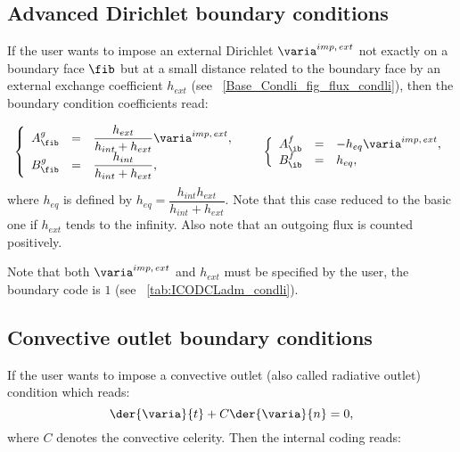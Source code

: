 \subsection{Advanced Dirichlet boundary conditions}
If the user wants to impose an external Dirichlet $\varia^{imp, \, ext}$ not exactly on a boundary face $\fib$ but at a small distance
related to the boundary face by an external exchange coefficient $h_{ext}$
(see \figurename~\ref{Base_Condli_fig_flux_condli}), then  the boundary condition coefficients read:

\begin{equation}
\begin{array}{r c l}
\left\lbrace
\begin{array}{r c l}
A^g_\fib & = &\dfrac{h_{ext}}{h_{int}+h_{ext}} \varia^{imp, \, ext}, \\
B^g_\fib & = & \dfrac{h_{int}}{h_{int}+h_{ext}} ,
\end{array}
\right.
& &
\left\lbrace
\begin{array}{r c l}
A^f_\ib & = & -h_{eq} \varia^{imp, \, ext} , \\
B^f_\ib & = & h_{eq},
\end{array}
\right.
\end{array}
\end{equation}
where $h_{eq} $ is defined by $h_{eq}=\dfrac{h_{int} h_{ext}}{ h_{int} + h_{ext}}$.
Note that this case reduced to the basic one if $h_{ext}$ tends to the infinity.
Also note that an outgoing flux is counted positively.

\begin{remark}
Note that both $\varia^{imp, \, ext} $ and $ h_{ext} $ must be specified by the user, the boundary code is $1$ (see \tablename~\ref{tab:ICODCLadm_condli}).
\end{remark}

\subsection{Convective outlet boundary conditions}

If the user wants to impose a convective outlet (also called radiative outlet) condition which reads:
\begin{equation}
\der{ \varia}{ t} + C \der{ \varia}{ n} = 0,
\end{equation}
where $C$ denotes the convective celerity. Then the internal coding reads:

